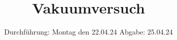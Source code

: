 

\subject{V70}
\title{Vakuumversuch}
\date{%
  Durchführung: Montag den 22.04.24
  \hspace{3em}
  Abgabe: 25.04.24
}



\maketitle
\thispagestyle{empty}
\tableofcontents
\newpage



%


\printbibliography{}
%

